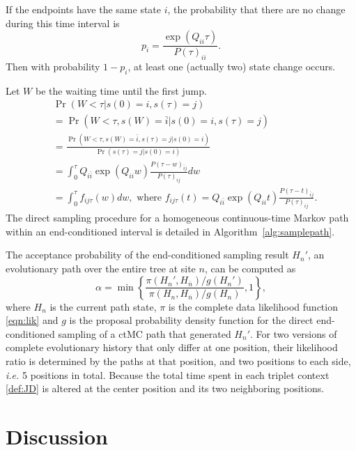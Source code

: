 \documentclass[11pt]{article}
\begin{document}
If the endpoints have the same state $i$, the probability that there
are no change during this time interval is
\begin{equation} \label{eqn:pnojump}
p_i = \frac{\exp(Q_{ii}\tau)}{P(\tau)_{ii}}.
\end{equation}
Then with probability $1-p_i$, at least one (actually two) state change occurs.

Let $W$ be the waiting time until the first jump.
\begin{equation}
\begin{aligned}
& \Pr(W < \tau | s(0) = i, s(\tau) = j)  \\
& =  \Pr(W < \tau, s(W) = \bar{i} | s(0) = i, s(\tau) = j)\\
& = \frac{\Pr(W < \tau, s(W) = \bar{i},s(\tau) = j | s(0) = i) } {\Pr(s(\tau) = j | s(0) = i)}  \\
& = \int_{0}^{\tau} Q_{i\bar{i}} \exp(Q_{ii}w) \frac{P(\tau-w)_{\bar{i}j}}{P(\tau)_{ij}} dw \\
& = \int_{0}^{\tau} f_{ij\tau}(w) dw, \text{~where~}
f_{ij\tau}(t) = Q_{i\bar{i}} \exp(Q_{ii}t) \frac{P(\tau-t)_{\bar{i}j}}{P(\tau)_{ij}}.
\end{aligned}
\end{equation}
The direct sampling procedure for a homogeneous continuous-time Markov
path within an end-conditioned interval is detailed in
Algorithm~\ref{alg:samplepath}.

The acceptance probability of the end-conditioned sampling result
$H_n'$, an evolutionary path over the entire tree at site $n$, can be
computed as
\begin{equation}\label{def:accept}
  \alpha = \min\left\{\frac{\pi(H_n', H_{\overline{n}})/g(H_n')}{\pi(H_n, H_{\overline{n}})/g(H_n)}, 1\right\},
\end{equation}
where $H_n$ is the current path state, $\pi$ is the complete data
likelihood function \eqref{eqn:lik} and $g$ is the proposal
probability density function for the direct end-conditioned sampling
of a ctMC path that generated $H_n'$.  For two versions of complete
evolutionary history that only differ at one position, their
likelihood ratio is determined by the paths at that position, and two
positions to each side, \textit{i.e.} 5 positions in total. Because
the total time spent in each triplet context \eqref{def:JD} is altered
at the center position and its two neighboring positions.

\section{Discussion}
\end{document}
